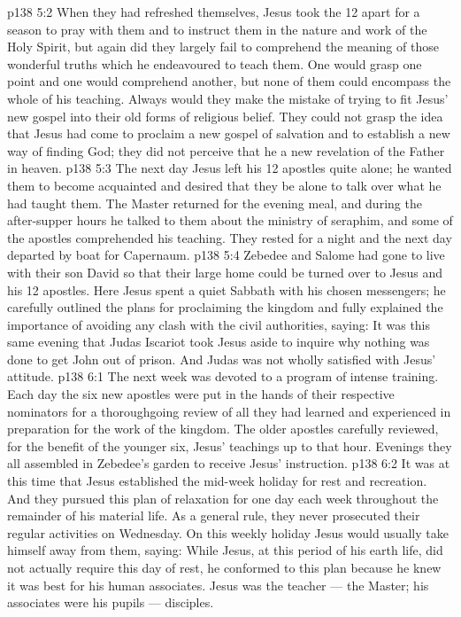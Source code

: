 \vs p138 5:2 \pc When they had refreshed themselves, Jesus took the 12 apart for a season to pray with them and to instruct them in the nature and work of the Holy Spirit, but again did they largely fail to comprehend the meaning of those wonderful truths which he endeavoured to teach them. One would grasp one point and one would comprehend another, but none of them could encompass the whole of his teaching. Always would they make the mistake of trying to fit Jesus’ new gospel into their old forms of religious belief. They could not grasp the idea that Jesus had come to proclaim a new gospel of salvation and to establish a new way of finding God; they did not perceive that he  a new revelation of the Father in heaven.
\vs p138 5:3 The next day Jesus left his 12 apostles quite alone; he wanted them to become acquainted and desired that they be alone to talk over what he had taught them. The Master returned for the evening meal, and during the after\hyp{}supper hours he talked to them about the ministry of seraphim, and some of the apostles comprehended his teaching. They rested for a night and the next day departed by boat for Capernaum.
\vs p138 5:4 Zebedee and Salome had gone to live with their son David so that their large home could be turned over to Jesus and his 12 apostles. Here Jesus spent a quiet Sabbath with his chosen messengers; he carefully outlined the plans for proclaiming the kingdom and fully explained the importance of avoiding any clash with the civil authorities, saying:  It was this same evening that Judas Iscariot took Jesus aside to inquire why nothing was done to get John out of prison. And Judas was not wholly satisfied with Jesus’ attitude.
\vs p138 6:1 The next week was devoted to a program of intense training. Each day the six new apostles were put in the hands of their respective nominators for a thoroughgoing review of all they had learned and experienced in preparation for the work of the kingdom. The older apostles carefully reviewed, for the benefit of the younger six, Jesus’ teachings up to that hour. Evenings they all assembled in Zebedee’s garden to receive Jesus’ instruction.
\vs p138 6:2 It was at this time that Jesus established the mid\hyp{}week holiday for rest and recreation. And they pursued this plan of relaxation for one day each week throughout the remainder of his material life. As a general rule, they never prosecuted their regular activities on Wednesday. On this weekly holiday Jesus would usually take himself away from them, saying:  While Jesus, at this period of his earth life, did not actually require this day of rest, he conformed to this plan because he knew it was best for his human associates. Jesus was the teacher --- the Master; his associates were his pupils --- disciples.
